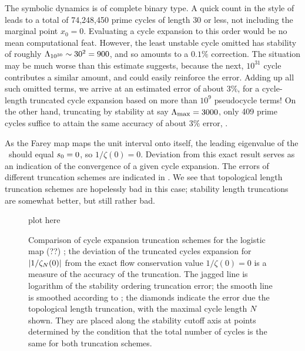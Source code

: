 The symbolic dynamics
is of complete binary type. A quick count in the style
of \wwwcb %
leads to a total of
74,248,450 prime cycles of length 30 or less, not including the marginal
point $x_0=0$. Evaluating a cycle expansion to this order
would be no mean computational feat.  However, the least unstable cycle
omitted has stability of roughly
$\Lambda_{10^{30}} \sim 30^2=900$, and so amounts to
a $0.1\%$ correction.  The situation may be much worse than this estimate
suggests, because the next, $10^{31}$
cycle contributes a similar amount, and could
easily reinforce the error.  Adding up all such omitted terms, we arrive
at an estimated error of about $3\%$,  for a cycle-length truncated
cycle expansion
based on more than $10^9$ pseudocycle terms! On the other hand,
truncating by stability at say $\stabCutoff=3000$,
only 409 prime cycles suffice to attain the same
accuracy of about $3\%$ error, .

As the Farey map maps the unit interval onto itself, the leading eigenvalue of
the \FPoper\ should equal $s_0=0$, so
$1/\zeta(0)=0$. Deviation from this exact result serves as an indication
of the convergence of a given cycle expansion.
The errors of different truncation
schemes are indicated in .
We see that topological length truncation schemes are hopelessly
bad in this case; stability length truncations are somewhat better,
but still rather bad.

\begin{figure}
\begin{center}
plot here %
\end{center}
\caption{
    {\small
Comparison of cycle expansion truncation schemes for the
logistic map (??)%
;
the deviation of the truncated cycles
expansion for $|1/\zeta_N(0)|$ from the exact
flow conservation value $1/\zeta(0)=0$ is a measure of the accuracy of the
truncation.  The jagged
line is logarithm of the stability ordering
truncation error; the smooth line is smoothed according to
; the diamonds indicate the error
due the topological length truncation, with
the maximal cycle length $N$ shown.
They are placed along the stability cutoff axis at points determined
by the condition that the total number of cycles is the same for both
truncation schemes.
        }}
\label{fig:logStabOrder}
\end{figure}
